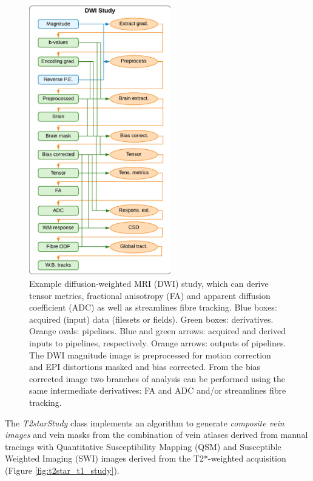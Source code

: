 \documentclass[smallextended]{svjour3}       %
\begin{document}
\begin{figure}
	\centering
    \includegraphics[width=0.55\textwidth]{../figures/dwi_study}
  \caption{Example diffusion-weighted MRI (DWI) study, which can derive
tensor metrics, fractional anisotropy (FA) and apparent diffusion
coefficient (ADC) as well as streamlines fibre tracking. Blue boxes:
acquired (input) data (filesets or fields). Green boxes: derivatives.
Orange ovals: pipelines. Blue and green arrows: acquired and derived
inputs to pipelines, respectively. Orange arrows: outputs of pipelines.
The DWI magnitude image is preprocessed for motion correction and EPI
distortions masked and bias corrected. From the bias corrected image two
branches of analysis can be performed using the same intermediate
derivatives: FA and ADC and/or streamlines fibre tracking.}
\label{fig:dwi_study}
\end{figure}

The \emph{T2starStudy} class implements an algorithm to generate
\emph{composite vein images} \citep{ward_combining_2018} and
vein masks \citep{ward_vein_2017} from the combination of
vein atlases derived from manual tracings with Quantitative
Susceptibility Mapping (QSM) and Susceptible Weighted Imaging (SWI)
images derived from the T2*-weighted acquisition (Figure \ref{fig:t2star_t1_study}).
\end{document}
